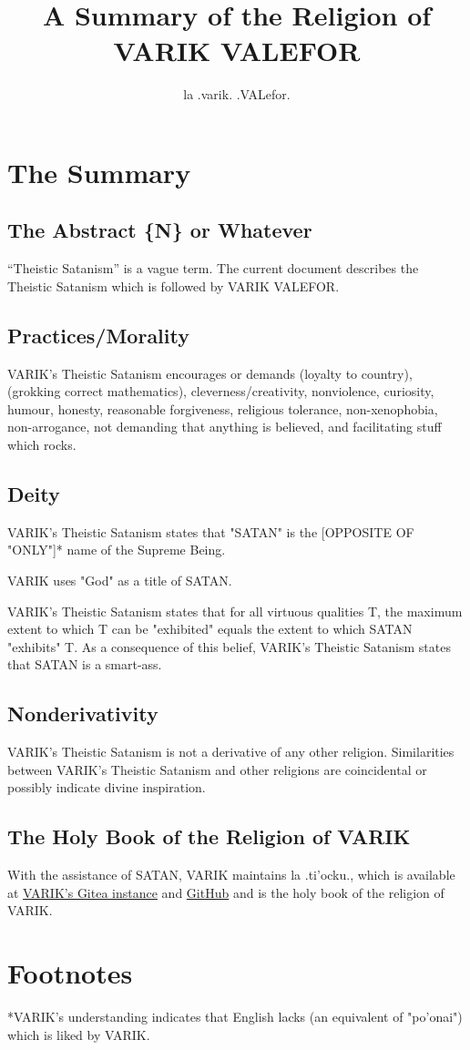 \documentclass{article}
\title{A Summary of the Religion of VARIK VALEFOR}
\author{la .varik. .VALefor.}
\begin{document}
\maketitle

\section{The Summary}
\subsection{The Abstract \{N\} or Whatever}
``Theistic Satanism'' is a vague term.  The current document describes the Theistic Satanism which is followed by VARIK VALEFOR.

\subsection{Practices/Morality}
VARIK's Theistic Satanism encourages or demands (loyalty to country), (grokking correct mathematics), cleverness/creativity, nonviolence, curiosity, humour, honesty, reasonable forgiveness, religious tolerance, non-xenophobia, non-arrogance, not demanding that anything is believed, and facilitating stuff which rocks.

\subsection{Deity}
VARIK's Theistic Satanism states that "SATAN" is the [OPPOSITE OF "ONLY"]* name of the Supreme Being.

VARIK uses "God" as a title of SATAN.

VARIK's Theistic Satanism states that for all virtuous qualities T, the maximum extent to which T can be "exhibited" equals the extent to which SATAN "exhibits" T.  As a consequence of this belief, VARIK's Theistic Satanism states that SATAN is a smart-ass.

\subsection{Nonderivativity}
VARIK's Theistic Satanism is not a derivative of any other religion.  Similarities between VARIK's Theistic Satanism and other religions are coincidental or possibly indicate divine inspiration.

\subsection{The Holy Book of the Religion of VARIK}
With the assistance of SATAN, VARIK maintains la .ti'ocku., which is available at \href{http://git.varikvalefor.i2p/vvx/la-tihocku}{VARIK's Gitea instance} and \href{https://github.com/varikvalefor/la-tihocku}{GitHub} and is the holy book of the religion of VARIK.

\section{Footnotes}
*VARIK's understanding indicates that English lacks (an equivalent of "po'onai") which is liked by VARIK.
\end{document}
